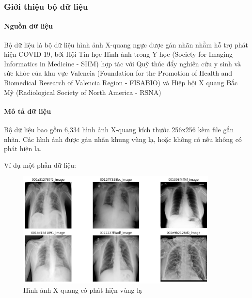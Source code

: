 \subsubsection{Giới thiệu bộ dữ liệu}
    \paragraph{Nguồn dữ liệu}
    \leavevmode

    Bộ dữ liệu là bộ dữ liệu hình ảnh X-quang ngực được gán nhãn nhằm hỗ trợ phát hiện COVID-19, bởi Hội Tin học Hình ảnh trong Y học (Society for Imaging Informatics in Medicine - SIIM) hợp tác với Quỹ thúc đẩy nghiên cứu y sinh và sức khỏe của khu vực Valencia (Foundation for the Promotion of Health and Biomedical Research of Valencia Region - FISABIO) và Hiệp hội X quang Bắc Mỹ (Radiological Society of North America - RSNA)

    \paragraph{Mô tả dữ liệu}
    \leavevmode
    
    Bộ dữ liệu bao gồm 6,334 hình ảnh X-quang kích thước 256x256 kèm file gắn nhãn. Các hình ảnh được gán nhãn khung vùng lạ, hoặc không có nếu không có phát hiện lạ.

    Ví dụ một phần dữ liệu:

    \begin{figure}[htp]
        \centering
        \includegraphics[width=0.90\textwidth]{images/Img_lung_label1_exp.png}
        \caption{Hình ảnh X-quang có phát hiện vùng lạ}
        \label{fig:Img_lung_label1_exp}
    \end{figure}
    \FloatBarrier

